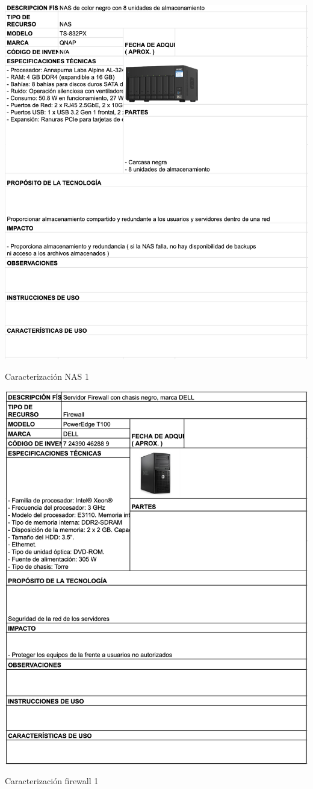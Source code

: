 \begin{table}[H]
    \centering
    \includegraphics[width=\textwidth]{tablas-images/cp1/NAS/nas-1.png}
    \caption{Caracterización NAS 1}\label{tab:nas-1}
\end{table}

\begin{table}[H]
    \centering
    \includegraphics[width=\textwidth]{tablas-images/cp1/firewall/firewall.png}
    \caption{Caracterización firewall 1}\label{tab:firewall-1}
\end{table}